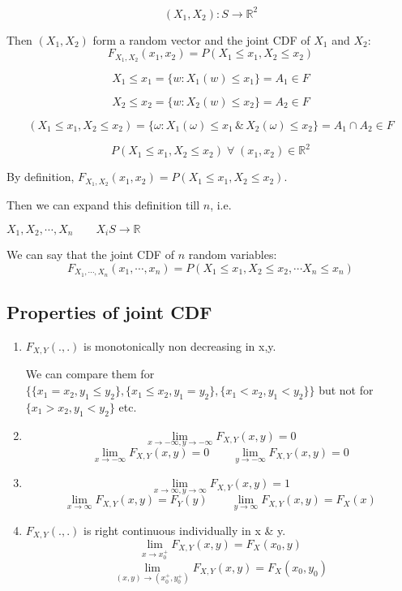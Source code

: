 \documentclass{article}
\begin{document}
$$ (X_1,X_2) :S \to {\mathbb{R}}^2$$

Then $(X_1,X_2) $ form a random vector and the joint CDF of $X_1$ and $X_2$:
$$ F_{X_1,X_2}(x_1,x_2)= P(X_1 \leq x_1, X_2 \leq x_2)$$

$$ X_1 \leq x_1 = \{ w: X_1(w) \leq x_1\}= A_1 \in F$$

$$ X_2 \leq x_2 = \{ w: X_2(w) \leq x_2\}= A_2 \in F$$

$$(X_1 \leq x_1, X_2 \leq x_2)= \{ \omega : X_1(\omega) \leq x_1 \, \& \, X_2(\omega) \leq x_2\} = A_1 \cap A_2 \in F$$

$$ P(X_1 \leq x_1 , X_2 \leq x_2) \; \forall \; (x_1 , x_2) \in {\mathbb{R}}^2$$

By definition, $ F_{X_1 , X_2}(x_1 , x_2) =  P(X_1 \leq x_1 , X_2 \leq x_2)$.

Then we can expand this definition till $n$, i.e.

$X_1,X_2, \cdots , X_n \qquad X_iS \to \mathbb{R}$

We can say that the joint CDF of $n$ random variables:
$$ F_{X_1,\cdots ,X_n}(x_1,\cdots ,x_n)= P(X_1 \leq x_1, X_2 \leq x_2, \cdots X_n \leq x_n)$$

\subsection{Properties of joint CDF}

\begin{enumerate}
    \item $F_{X,Y}(.,.) $ is monotonically non decreasing in x,y.

    We can compare them for $\{ \{ x_1 = x_2, y_1 \leq y_2 \}, \{x_1 \leq x_2, y_1 = y_2 \} , \{ x_1 < x_2 , y_1 < y_2\}\}$ but not for $\{ x_1 > x_2 , y_1 < y_2\}$ etc.
    \item $$ \lim_{x \to -\infty, y \to -\infty} F_{X,Y} (x,y)=0$$
    $$ \lim_{x \to -\infty} F_{X,Y} (x,y)=0\qquad \lim_{y \to -\infty} F_{X,Y} (x,y)=0$$

    \item $$ \lim_{x \to \infty, y \to \infty} F_{X,Y} (x,y)=1$$
    $$ \lim_{x \to \infty} F_{X,Y} (x,y)= F_Y (y)\qquad \lim_{y \to \infty} F_{X,Y} (x,y)= F_X(x)$$

    \item $F_{X,Y}(.,.)$ is right continuous individually in x \& y.
    $$ \lim_{x \to x_0^{+}} F_{X,Y} (x,y)=F_X(x_0,y)$$
    $$ \lim_{(x,y) \to (x_0^{+},y_0^{+})} F_{X,Y} (x,y)=F_X(x_0,y_0)$$

\end{enumerate}
\end{document}
